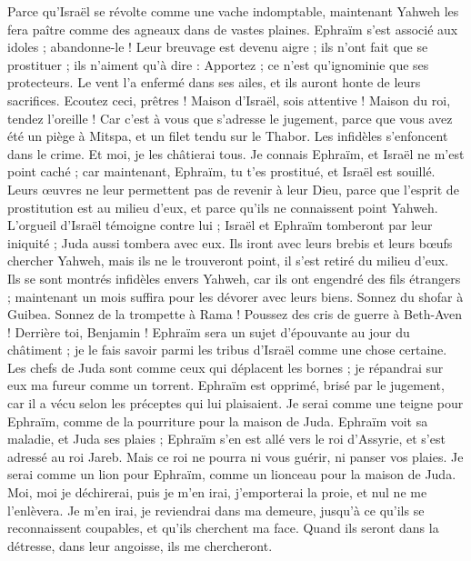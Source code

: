 \begin{multicols}{2}
Parce qu'Israël se révolte comme une vache indomptable, maintenant Yahweh les fera paître comme des agneaux dans de vastes plaines.
Ephraïm s'est associé aux idoles ; abandonne-le !
Leur breuvage est devenu aigre ; ils n'ont fait que se prostituer ; ils n'aiment qu'à dire : Apportez ; ce n'est qu'ignominie que ses protecteurs.
Le vent l'a enfermé dans ses ailes, et ils auront honte de leurs sacrifices.
\VerseOne{}Ecoutez ceci, prêtres ! Maison d'Israël, sois attentive ! Maison du roi, tendez l'oreille ! Car c'est à vous que s'adresse le jugement, parce que vous avez été un piège à Mitspa, et un filet tendu sur le Thabor.
Les infidèles s'enfoncent dans le crime. Et moi, je les châtierai tous.
Je connais Ephraïm, et Israël ne m'est point caché ; car maintenant, Ephraïm, tu t'es prostitué, et Israël est souillé.
Leurs œuvres ne leur permettent pas de revenir à leur Dieu, parce que l'esprit de prostitution est au milieu d'eux, et parce qu'ils ne connaissent point Yahweh.
L'orgueil d'Israël témoigne contre lui ; Israël et Ephraïm tomberont par leur iniquité ; Juda aussi tombera avec eux.
Ils iront avec leurs brebis et leurs bœufs chercher Yahweh, mais ils ne le trouveront point, il s'est retiré du milieu d'eux.
Ils se sont montrés infidèles envers Yahweh, car ils ont engendré des fils étrangers ; maintenant un mois suffira pour les dévorer avec leurs biens.
Sonnez du shofar à Guibea. Sonnez de la trompette à Rama ! Poussez des cris de guerre à Beth-Aven ! Derrière toi, Benjamin !
Ephraïm sera un sujet d'épouvante au jour du châtiment ; je le fais savoir parmi les tribus d'Israël comme une chose certaine.
Les chefs de Juda sont comme ceux qui déplacent les bornes ; je répandrai sur eux ma fureur comme un torrent.
Ephraïm est opprimé, brisé par le jugement, car il a vécu selon les préceptes qui lui plaisaient.
Je serai comme une teigne pour Ephraïm, comme de la pourriture pour la maison de Juda.
Ephraïm voit sa maladie, et Juda ses plaies ; Ephraïm s'en est allé vers le roi d'Assyrie, et s'est adressé au roi Jareb. Mais ce roi ne pourra ni vous guérir, ni panser vos plaies.
Je serai comme un lion pour Ephraïm, comme un lionceau pour la maison de Juda. Moi, moi je déchirerai, puis je m'en irai, j'emporterai la proie, et nul ne me l'enlèvera.
Je m'en irai, je reviendrai dans ma demeure, jusqu'à ce qu'ils se reconnaissent coupables, et qu'ils cherchent ma face. Quand ils seront dans la détresse, dans leur angoisse, ils me chercheront.

\end{multicols}
